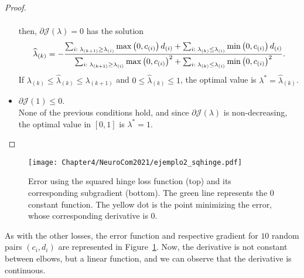 \begin{proof}
\begin{itemize}
\begin{equation}
\begin{aligned}
            \end{aligned}        
        \end{equation}
        then, $\partial \mathcal{J}(\lambda) = 0$ has the solution
        \begin{equation}
            \nonumber
            \widehat{\lambda}_{(k)} = - \frac{\sum_{i:\; \lambda_{(k+1)} \geq \lambda_{(i)}} \max\left(0, c_{(i)}\right) d_{(i)} + \sum_{i:\; \lambda_{(k)} \leq \lambda_{(i)}} \min\left(0, c_{(i)}\right) d_{(i)}}{\sum_{i:\; \lambda_{(k+1)} \geq \lambda_{(i)}} \max\left(0, c_{(i)}\right)^2 + \sum_{i:\; \lambda_{(k)} \leq \lambda_{(i)}} \min\left(0, c_{(i)}\right)^2} .
        \end{equation}
        If $\lambda_{(k)} \leq \widehat{\lambda}_{(k)} \leq \lambda_{(k+1)}$ and $0 \leq \widehat{\lambda}_{(k)} \leq 1$, the optimal value is $\lambda^* = \widehat{\lambda}_{(k)}$.
        \item $\partial \mathcal{J}(1) \leq 0$. 
        \\None of the previous conditions hold, and since $\partial \mathcal{J}(\lambda)$ is non-decreasing, the optimal value in $[0, 1]$ is $\lambda^* = 1$.
    \end{itemize}
\end{proof}


\begin{figure}[t!]
    \centering
    \texttt{[image: Chapter4/NeuroCom2021/ejemplo2\_sqhinge.pdf]}
    \caption{Error using the squared hinge loss function (top) and its corresponding subgradient (bottom). The green line represents the $0$ constant function. The yellow dot is the point minimizing the error, whose corresponding derivative is $0$.}
    \label{fig:sqhinge_error}
\end{figure}

As with the other losses, the error function and respective gradient for $10$ random pairs $(c_i, d_i)$ are represented in Figure~\ref{fig:sqhinge_error}.
Now, the derivative is not constant between elbows, but a linear function, and we can observe that the derivative is continuous. 

